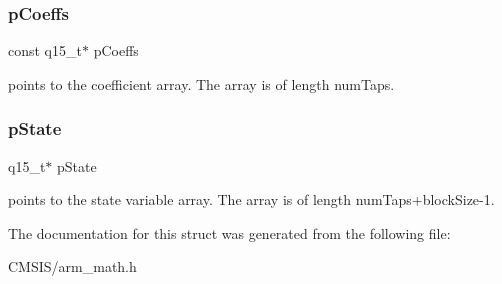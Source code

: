 \subsubsection{\texorpdfstring{pCoeffs}{pCoeffs}}
{\footnotesize\ttfamily const q15\+\_\+t$\ast$ p\+Coeffs}

points to the coefficient array. The array is of length num\+Taps. \mbox{\label{structarm__fir__instance__q15_ae29dfdb736374fcddaeaec4b7770170c}} 
\subsubsection{\texorpdfstring{pState}{pState}}
{\footnotesize\ttfamily q15\+\_\+t$\ast$ p\+State}

points to the state variable array. The array is of length num\+Taps+block\+Size-\/1. 

The documentation for this struct was generated from the following file\+:\begin{DoxyCompactItemize}
\item 
C\+M\+S\+I\+S/arm\+\_\+math.\+h\end{DoxyCompactItemize}
